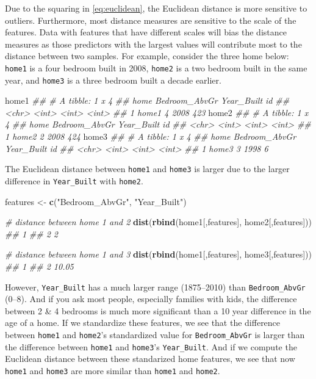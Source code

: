 \documentclass[]{krantz}
\makeatletter
\newenvironment{Shaded}{\begin{snugshade}}{\end{snugshade}}
\newcommand{\CommentTok}[1]{\textcolor[rgb]{0.37,0.37,0.37}{\textit{#1}}}
\newcommand{\KeywordTok}[1]{\textcolor[rgb]{0.27,0.27,0.27}{\textbf{#1}}}
\newcommand{\NormalTok}[1]{#1}
\newcommand{\StringTok}[1]{\textcolor[rgb]{0.5,0.5,0.5}{#1}}
\newenvironment{kframe}{%
\medskip{}
\setlength{\fboxsep}{.8em}
 \def\at@end@of@kframe{}%
 \ifinner\ifhmode%
  \def\at@end@of@kframe{\end{minipage}}%
  \begin{minipage}{\columnwidth}%
 \fi\fi%
 \def\FrameCommand##1{\hskip\@totalleftmargin \hskip-\fboxsep
 \colorbox{shadecolor}{##1}\hskip-\fboxsep
     \hskip-\linewidth \hskip-\@totalleftmargin \hskip\columnwidth}%
 \MakeFramed {\advance\hsize-\width
   \@totalleftmargin\z@ \linewidth\hsize
   \@setminipage}}%
 {\par\unskip\endMakeFramed%
 \at@end@of@kframe}
\renewenvironment{Shaded}{\begin{kframe}}{\end{kframe}}
\makeatother
\begin{document}
Due to the squaring in \eqref{eq:euclidean}, the Euclidean distance is more sensitive to outliers. Furthermore, most distance measures are sensitive to the scale of the features. Data with features that have different scales will bias the distance measures as those predictors with the largest values will contribute most to the distance between two samples. For example, consider the three home below: \texttt{home1} is a four bedroom built in 2008, \texttt{home2} is a two bedroom built in the same year, and \texttt{home3} is a three bedroom built a decade earlier.

\begin{Shaded}
\begin{Highlighting}[]
\NormalTok{home1}
\CommentTok{## # A tibble: 1 x 4}
\CommentTok{##   home  Bedroom_AbvGr Year_Built    id}
\CommentTok{##   <chr>         <int>      <int> <int>}
\CommentTok{## 1 home1             4       2008   423}
\NormalTok{home2}
\CommentTok{## # A tibble: 1 x 4}
\CommentTok{##   home  Bedroom_AbvGr Year_Built    id}
\CommentTok{##   <chr>         <int>      <int> <int>}
\CommentTok{## 1 home2             2       2008   424}
\NormalTok{home3}
\CommentTok{## # A tibble: 1 x 4}
\CommentTok{##   home  Bedroom_AbvGr Year_Built    id}
\CommentTok{##   <chr>         <int>      <int> <int>}
\CommentTok{## 1 home3             3       1998     6}
\end{Highlighting}
\end{Shaded}

The Euclidean distance between \texttt{home1} and \texttt{home3} is larger due to the larger difference in \texttt{Year\_Built} with \texttt{home2}.

\begin{Shaded}
\begin{Highlighting}[]
\NormalTok{features <-}\StringTok{ }\KeywordTok{c}\NormalTok{(}\StringTok{"Bedroom_AbvGr"}\NormalTok{, }\StringTok{"Year_Built"}\NormalTok{)}

\CommentTok{# distance between home 1 and 2}
\KeywordTok{dist}\NormalTok{(}\KeywordTok{rbind}\NormalTok{(home1[,features], home2[,features]))}
\CommentTok{##   1}
\CommentTok{## 2 2}

\CommentTok{# distance between home 1 and 3}
\KeywordTok{dist}\NormalTok{(}\KeywordTok{rbind}\NormalTok{(home1[,features], home3[,features]))}
\CommentTok{##       1}
\CommentTok{## 2 10.05}
\end{Highlighting}
\end{Shaded}

However, \texttt{Year\_Built} has a much larger range (1875--2010) than \texttt{Bedroom\_AbvGr} (0--8). And if you ask most people, especially families with kids, the difference between 2 \& 4 bedrooms is much more significant than a 10 year difference in the age of a home. If we standardize these features, we see that the difference between \texttt{home1} and \texttt{home2}'s standardized value for \texttt{Bedroom\_AbvGr} is larger than the difference between \texttt{home1} and \texttt{home3}'s \texttt{Year\_Built}. And if we compute the Euclidean distance between these standarized home features, we see that now \texttt{home1} and \texttt{home3} are more similar than \texttt{home1} and \texttt{home2}.
\end{document}
